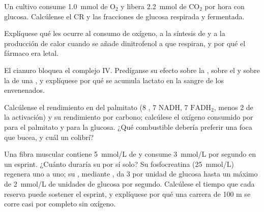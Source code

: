 \begin{exercise}[$\star\star$]\label{exo:b1:respiration-fermentation:7}
Un cultivo consume \qty{1.0}{mmol} de $\mathrm{O_2}$ y libera
\qty{2.2}{mmol} de $\mathrm{CO_2}$ por hora con glucosa. Calcúlense el CR y
las fracciones de glucosa respirada y fermentada.
\end{exercise}

\begin{exercise}[$\star\star$]\label{exo:b1:respiration-fermentation:8}
Explíquese qué les ocurre al consumo de oxígeno, a la síntesis de  y a la
producción de calor cuando se añade dinitrofenol a  que respiran,
y por qué el fármaco era letal.
\end{exercise}

\begin{exercise}[$\star\star$]\label{exo:b1:respiration-fermentation:9}
El cianuro bloquea el complejo IV. Predíganse su efecto sobre la , sobre el  y sobre la  de una , y
explíquese por qué se acumula lactato en la sangre de los envenenados.
\end{exercise}

\begin{exercise}[$\star\star\star$]\label{exo:b1:respiration-fermentation:10}
Calcúlense el rendimiento en  del palmitato (8 , 7 NADH, 7
$\mathrm{FADH_2}$, menos 2  de la activación) y su rendimiento por
carbono; calcúlese el oxígeno consumido por  para el palmitato y para la
glucosa. ¿Qué combustible debería preferir una foca que bucea, y cuál un
colibrí?
\end{exercise}

\begin{exercise}[$\star\star\star$]\label{exo:b1:respiration-fermentation:11}
Una fibra muscular contiene \qty{5}{mmol/L} de  y consume
\qty{3}{mmol/L} por segundo en un esprint. ¿Cuánto duraría su  por sí
solo? Su fosfocreatina (\qty{25}{mmol/L}) regenera  uno a uno; su
, mediante , da 3  por unidad de glucosa hasta un
máximo de \qty{2}{mmol/L} de unidades de glucosa por segundo. Calcúlese el
tiempo que cada reserva puede sostener el esprint, y explíquese por qué una
carrera de 100 m se corre casi por completo sin oxígeno.
\end{exercise}

